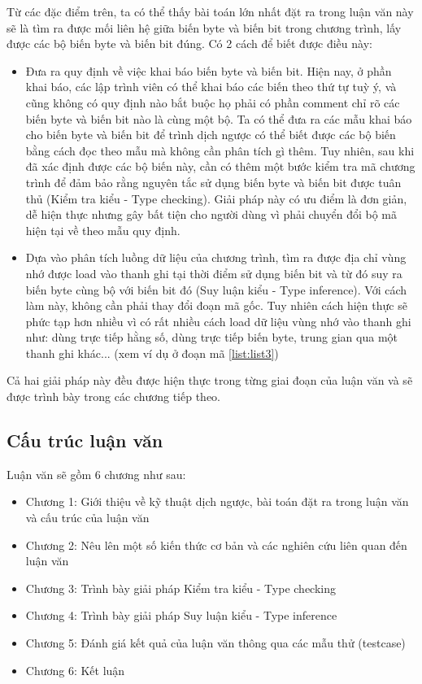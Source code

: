 Từ các đặc điểm trên, ta có thể thấy bài toán lớn nhất đặt ra trong luận văn này sẽ là tìm ra được mối liên hệ giữa biến byte và biến bit trong chương trình, lấy được các bộ biến byte và biến bit đúng. Có 2 cách để biết được điều này:
\begin{itemize}
	\item Đưa ra quy định về việc khai báo biến byte và biến bit. Hiện nay, ở phần khai báo, các lập trình viên có thể khai báo các biến theo thứ tự tuỳ ý, và cũng không có quy định nào bắt buộc họ phải có phần comment chỉ rõ các biến byte và biến bit nào là cùng một bộ. Ta có thể đưa ra các mẫu khai báo cho biến byte và biến bit để trình dịch ngược có thể biết được các bộ biến bằng cách đọc theo mẫu mà không cần phân tích gì thêm. Tuy nhiên, sau khi đã xác định được các bộ biến này, cần có thêm một bước kiểm tra mã chương trình để đảm bảo rằng nguyên tắc sử dụng biến byte và biến bit được tuân thủ (Kiểm tra kiểu - Type checking). Giải pháp này có ưu điểm là đơn giản, dễ hiện thực nhưng gây bất tiện cho người dùng vì phải chuyển đổi bộ mã hiện tại về theo mẫu quy định.
	\item Dựa vào phân tích luồng dữ liệu của chương trình, tìm ra được địa chỉ vùng nhớ được load vào thanh ghi tại thời điểm sử dụng biến bit và từ đó suy ra biến byte cùng bộ với biến bit đó (Suy luận kiểu - Type inference). Với cách làm này, không cần phải thay đổi đoạn mã gốc. Tuy nhiên cách hiện thực sẽ phức tạp hơn nhiều vì có rất nhiều cách load dữ liệu vùng nhớ vào thanh ghi như: dùng trực tiếp hằng số, dùng trực tiếp biến byte, trung gian qua một thanh ghi khác... (xem ví dụ ở đoạn mã \ref{list:list3})
\end{itemize}

Cả hai giải pháp này đều được hiện thực trong từng giai đoạn của luận văn và sẽ được trình bày trong các chương tiếp theo.

\subsection{Cấu trúc luận văn}
Luận văn sẽ gồm 6 chương như sau:
\begin{itemize}
	\item Chương 1: Giới thiệu về kỹ thuật dịch ngược, bài toán đặt ra trong luận văn và cấu trúc của luận văn
	\item Chương 2: Nêu lên một số kiến thức cơ bản và các nghiên cứu liên quan đến luận văn
	\item Chương 3: Trình bày giải pháp Kiểm tra kiểu - Type checking
	\item Chương 4: Trình bày giải pháp Suy luận kiểu - Type inference
	\item Chương 5: Đánh giá kết quả của luận văn thông qua các mẫu thử (testcase)
	\item Chương 6: Kết luận
\end{itemize}